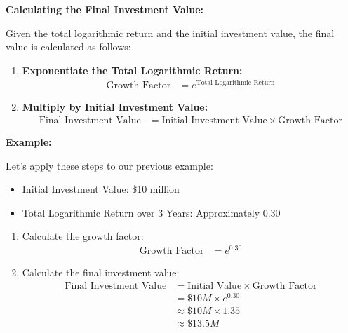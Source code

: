 \documentclass{article}
\begin{document}
\textbf{Calculating the Final Investment Value:}

Given the total logarithmic return and the initial investment value, the final value is calculated as follows:

\begin{enumerate}
    \item \textbf{Exponentiate the Total Logarithmic Return:}
          \begin{align*}
              \text{Growth Factor} &= e^{\text{Total Logarithmic Return}}
          \end{align*}

    \item \textbf{Multiply by Initial Investment Value:}
          \begin{align*}
              \text{Final Investment Value} &= \text{Initial Investment Value} \times \text{Growth Factor}
          \end{align*}
\end{enumerate}

\textbf{Example:}

Let's apply these steps to our previous example:

\begin{itemize}
    \item Initial Investment Value: \$10 million
    \item Total Logarithmic Return over 3 Years: Approximately 0.30
\end{itemize}

\begin{enumerate}
    \item Calculate the growth factor:
    \begin{align*}
        \text{Growth Factor} &= e^{0.30}
    \end{align*}
    
    \item Calculate the final investment value:
    \begin{align*}
        \text{Final Investment Value} &= \text{Initial Value} \times \text{Growth Factor} \\
                                      &= \$10M \times e^{0.30} \\
                                      &\approx \$10M \times 1.35 \\
                                      &\approx \$13.5M
    \end{align*}
\end{enumerate}
\end{document}
